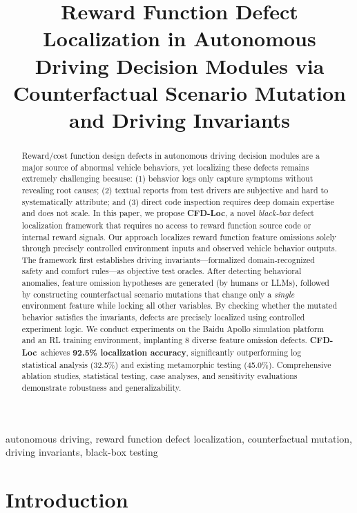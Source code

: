 \documentclass[conference]{IEEEtran}
\title{\textbf{Reward Function Defect Localization} in Autonomous Driving Decision Modules via Counterfactual Scenario Mutation and Driving Invariants}
\author{
\IEEEauthorblockN{\textbf{Wenjia Niu}}
\IEEEauthorblockA{School of Cyberspace Science and Technology \\
Beijing Jiaotong University, Beijing, China 100044 \\
Email: Niuwj@bjtu.edu.cn}
}
\theoremstyle{plain}
\newcommand{\methodname}{\textbf{CFD-Loc}}
\begin{document}
\maketitle

\begin{abstract}
\noindent
Reward/cost function design defects in autonomous driving decision modules are a major source of abnormal vehicle behaviors, yet localizing these defects remains extremely challenging because: (1) behavior logs only capture symptoms without revealing root causes; (2) textual reports from test drivers are subjective and hard to systematically attribute; and (3) direct code inspection requires deep domain expertise and does not scale. In this paper, we propose \methodname, a novel \emph{black-box} defect localization framework that requires no access to reward function source code or internal reward signals. Our approach localizes reward function feature omissions solely through precisely controlled environment inputs and observed vehicle behavior outputs. The framework first establishes driving invariants---formalized domain-recognized safety and comfort rules---as objective test oracles. After detecting behavioral anomalies, feature omission hypotheses are generated (by humans or LLMs), followed by constructing counterfactual scenario mutations that change only a \emph{single} environment feature while locking all other variables. By checking whether the mutated behavior satisfies the invariants, defects are precisely localized using controlled experiment logic. We conduct experiments on the Baidu Apollo simulation platform and an RL training environment, implanting 8 diverse feature omission defects. \methodname\ achieves \textbf{92.5\% localization accuracy}, significantly outperforming log statistical analysis (32.5\%) and existing metamorphic testing (45.0\%). Comprehensive ablation studies, statistical testing, case analyses, and sensitivity evaluations demonstrate robustness and generalizability.
\end{abstract}

\begin{IEEEkeywords}
autonomous driving, reward function defect localization, counterfactual mutation, driving invariants, black-box testing
\end{IEEEkeywords}

\section{Introduction}
\label{sec:intro}
\end{document}

